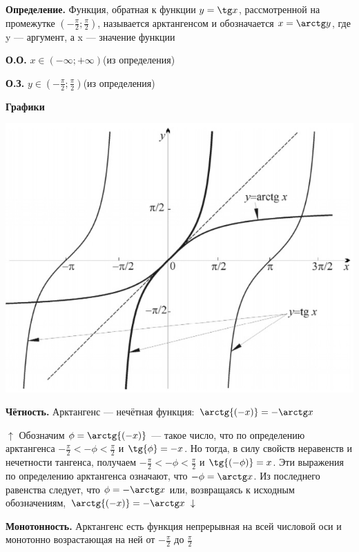 \documentclass{article}
\begin{document}
        \textbf{Определение.} Функция, обратная к функции \(y = \tg x\), рассмотренной на промежутке \((-\frac{\pi}{2}; \frac{\pi}{2})\), называется арктангенсом и обозначается \(x = \arctg y\), где y --- аргумент, а x --- значение функции
        
        \textbf{О.О.} \(x \in (-\infty; +\infty)\)(из определения)
        
        \textbf{О.З.} \(y \in (-\frac{\pi}{2}; \frac{\pi}{2})\)(из определения)
        
        \textbf{Графики}
        \begin{center}
            \includegraphics[scale=0.4]{6}
        \end{center}
        
        \textbf{Чётность.} Арктангенс --- нечётная функция: \(\arctg{(-x)} = -\arctg x\)
        
        \(\uparrow\) Обозначим \(\phi = \arctg{(-x)}\) --- такое число, что по определению арктангенса \(-\frac{\pi}{2} < -\phi < \frac{\pi}{2}\) и \(\tg{\phi} = -x\). Но тогда, в силу свойств неравенств и нечетности тангенса, получаем
        \(-\frac{\pi}{2} < -\phi < \frac{\pi}{2}\) и \(\tg{(-\phi)} = x\). Эти выражения по определению арктангенса означают, что \(-\phi = \arctg x\).
        Из последнего равенства следует, что \(\phi = -\arctg x\) или, возвращаясь к исходным обозначениям, \(\arctg{(-x)} = -\arctg x\ \downarrow\)
        
        \textbf{Монотонность.} Арктангенс есть функция непрерывная на всей числовой оси и монотонно возрастающая на ней от \(-\frac{\pi}{2}\) до \(\frac{\pi}{2}\)
        
\end{document}
